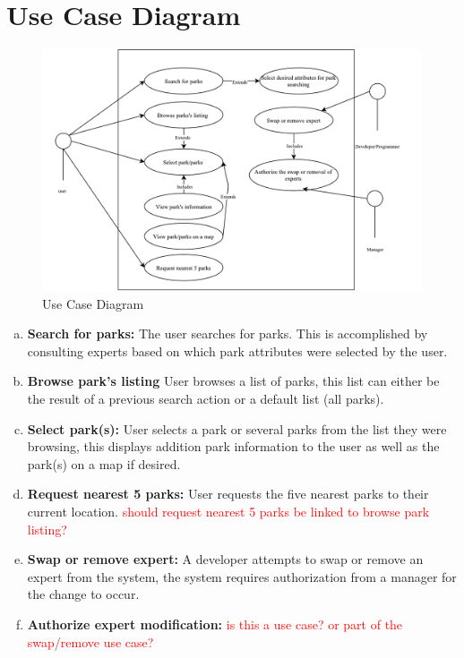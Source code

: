 \documentclass[titlepage]{article}
\begin{document}


\section{Use Case Diagram}
\label{sec:use_case_diagram}


\begin{figure}[htbp]
\centerline{\includegraphics[width=1.0\textwidth]{images//UseCase}}
\caption{Use Case Diagram}
\label{useCaseDiagram}
\end{figure}

\begin{enumerate}[a)]
    \item \textbf{Search for parks:} The user searches for parks. This is accomplished by consulting experts based on which park attributes were selected by the user.
    \item \textbf{Browse park's listing} User browses a list of parks, this list can either be the result of a previous search action or a default list (all parks).
    \item \textbf{Select park(s):} User selects a park or several parks from the list they were browsing, this displays addition park information to the user as well as the park(s) on a map if desired.
    \item \textbf{Request nearest 5 parks:} User requests the five nearest parks to their current location. \textcolor{red}{should request nearest 5 parks be linked to browse park listing?}
    \item \textbf{Swap or remove expert:} A developer attempts to swap or remove an expert from the system, the system requires authorization from a manager for the change to occur.
    \item \textbf{Authorize expert modification:} \textcolor{red}{is this a use case? or part of the swap/remove use case?}
\end{enumerate}
\end{document}
